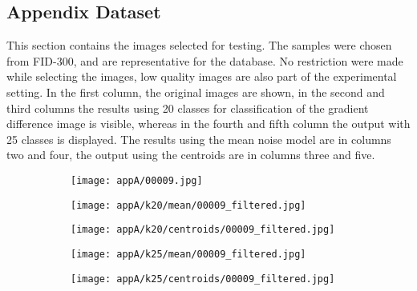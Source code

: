\documentclass[draft,final]{vutinfth} %
\begin{document}
\backmatter


\cleardoublepage %







\begin{appendices}
		\chapter{Appendix Dataset}
		\label{AppA}
		This section contains the images selected for testing.
		The samples were chosen from FID-300, and are representative for the database.
No restriction were made while selecting the images, low quality images are also part of the experimental setting.
		In the first column, the original images are shown, in the second and third columns the results using 20 classes for classification of the gradient difference image is visible, whereas in the fourth and fifth column the output with 25 classes is displayed.
		The results using the mean noise model are in columns two and four, the output using the centroids are in columns three and five.
\begin{figure}[h]
\centering
  \begin{subfigure}[t]{0.19\columnwidth}
    \centering
    \texttt{[image: appA/00009.jpg]}
  \end{subfigure}
  \begin{subfigure}[t]{0.19\columnwidth}
    \centering
    \texttt{[image: appA/k20/mean/00009\_filtered.jpg]}
  \end{subfigure}
  \begin{subfigure}[t]{0.19\columnwidth}
    \centering
    \texttt{[image: appA/k20/centroids/00009\_filtered.jpg]}
  \end{subfigure}
  \begin{subfigure}[t]{0.19\columnwidth}
    \centering
    \texttt{[image: appA/k25/mean/00009\_filtered.jpg]}
  \end{subfigure}
  \begin{subfigure}[t]{0.19\columnwidth}
    \centering
    \texttt{[image: appA/k25/centroids/00009\_filtered.jpg]}
  \end{subfigure}
\caption{}
\end{figure}  


\end{appendices}
\end{document}
